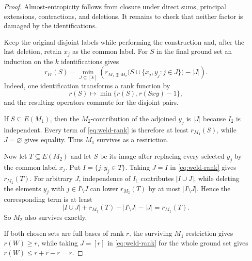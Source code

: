 \documentclass[10pt,a4paper]{amsart}
\begin{document}
\begin{proof}
Almost-entropicity follows from closure under direct sums, principal extensions, contractions, and deletions.  It remains to check that neither factor is damaged by the identifications.

Keep the original disjoint labels while performing the construction and, after the last deletion, retain $x_j$ as the common label.  For $S$ in the final ground set an induction on the $k$ identifications gives
\begin{equation}\label{eq:weld-rank}
 r_W(S)=
 \min_{J\subseteq[k]}
 \left(
 r_{M_1\oplus M_2}
 \bigl(S\cup\{x_j,y_j:j\in J\}\bigr)-|J|
 \right).
\end{equation}
Indeed, one identification transforms a rank function by
\[
 r(S)\longmapsto \min\{r(S),r(Sxy)-1\},
\]
and the resulting operators commute for the disjoint pairs.

If $S\subseteq E(M_1)$, then the $M_2$-contribution of the adjoined $y_j$ is $|J|$ because $I_2$ is independent.  Every term of \eqref{eq:weld-rank} is therefore at least $r_{M_1}(S)$, while $J=\varnothing$ gives equality.  Thus $M_1$ survives as a restriction.

Now let $T\subseteq E(M_2)$ and let $S$ be its image after replacing every selected $y_j$ by the common label $x_j$.  Put $I=\{j:y_j\in T\}$.  Taking $J=I$ in \eqref{eq:weld-rank} gives $r_{M_2}(T)$.  For arbitrary $J$, independence of $I_1$ contributes $|I\cup J|$, while deleting the elements $y_j$ with $j\in I\setminus J$ can lower $r_{M_2}(T)$ by at most $|I\setminus J|$.  Hence the corresponding term is at least
\[
 |I\cup J|+r_{M_2}(T)-|I\setminus J|-|J|
 =r_{M_2}(T).
\]
So $M_2$ also survives exactly.

If both chosen sets are full bases of rank $r$, the surviving $M_1$ restriction gives $r(W)\ge r$, while taking $J=[r]$ in \eqref{eq:weld-rank} for the whole ground set gives $r(W)\le r+r-r=r$.
\end{proof}
\end{document}
